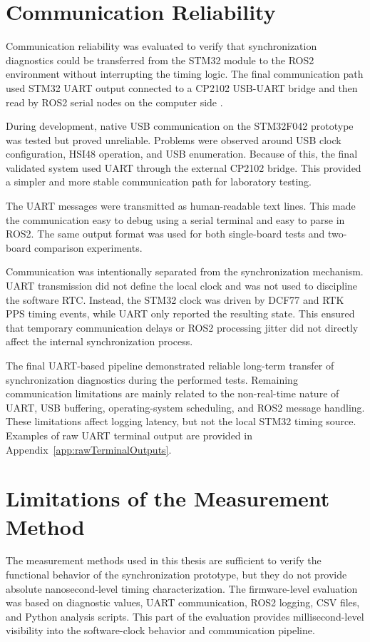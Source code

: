 \section{Communication Reliability}

Communication reliability was evaluated to verify that synchronization diagnostics could be transferred from the STM32 module to the ROS2 environment without interrupting the timing logic. The final communication path used STM32 UART output connected to a CP2102 USB-UART bridge and then read by ROS2 serial nodes on the computer side \cite{cp2102Datasheet,ros2Docs}.

During development, native USB communication on the STM32F042 prototype was tested but proved unreliable. Problems were observed around USB clock configuration, HSI48 operation, and USB enumeration. Because of this, the final validated system used UART through the external CP2102 bridge. This provided a simpler and more stable communication path for laboratory testing.

The UART messages were transmitted as human-readable text lines. This made the communication easy to debug using a serial terminal and easy to parse in ROS2. The same output format was used for both single-board tests and two-board comparison experiments.

Communication was intentionally separated from the synchronization mechanism. UART transmission did not define the local clock and was not used to discipline the software RTC. Instead, the STM32 clock was driven by DCF77 and RTK PPS timing events, while UART only reported the resulting state. This ensured that temporary communication delays or ROS2 processing jitter did not directly affect the internal synchronization process.

The final UART-based pipeline demonstrated reliable long-term transfer of synchronization diagnostics during the performed tests. Remaining communication limitations are mainly related to the non-real-time nature of UART, USB buffering, operating-system scheduling, and ROS2 message handling. These limitations affect logging latency, but not the local STM32 timing source. Examples of raw UART terminal output are provided in Appendix~\ref{app:rawTerminalOutputs}.

\section{Limitations of the Measurement Method}

The measurement methods used in this thesis are sufficient to verify the functional behavior of the synchronization prototype, but they do not provide absolute nanosecond-level timing characterization. The firmware-level evaluation was based on diagnostic values, UART communication, ROS2 logging, CSV files, and Python analysis scripts. This part of the evaluation provides millisecond-level visibility into the software-clock behavior and communication pipeline.

